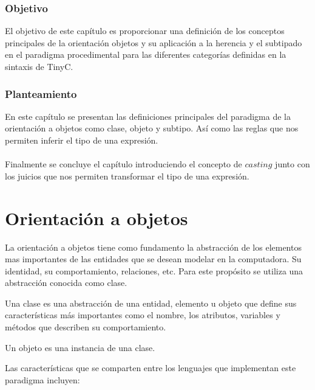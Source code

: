 \subsubsection{Objetivo}
El objetivo de este capítulo es proporcionar una definición de los conceptos principales de la orientación objetos y su aplicación a la herencia y el subtipado en el paradigma procedimental para las diferentes categorías definidas en la sintaxis de \textsf{TinyC}.

\subsubsection{Planteamiento}
En este capítulo se presentan las definiciones principales del paradigma de la orientación a objetos como clase, objeto y subtipo. Así como las reglas que nos permiten inferir el tipo de una expresión.\\\\
Finalmente se concluye el capítulo introduciendo el concepto de $casting$ junto con los juicios que nos permiten transformar el tipo de una expresión. 

\section{Orientación a objetos}
La orientación a objetos tiene como fundamento la abstracción de los elementos mas importantes de las entidades que se desean modelar en la computadora. Su identidad, su comportamiento, relaciones, etc. Para este propósito se utiliza una abstracción conocida como clase. 

\begin{definition}
    Una clase es una abstracción de una entidad, elemento u objeto que define sus características más importantes como el nombre, los atributos, variables y métodos que describen su comportamiento.
\end{definition}
\bigskip
\begin{definition}
    Un objeto es una instancia de una clase.
\end{definition}

Las características que se comparten entre los lenguajes que implementan este paradigma incluyen:

